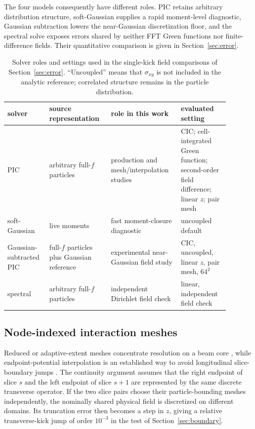 \documentclass[a4paper,fleqn]{cas-sc}
\begin{document}
The four models consequently have different roles.  PIC retains arbitrary
distribution structure, soft-Gaussian supplies a rapid moment-level
diagnostic, Gaussian subtraction lowers the near-Gaussian discretization
floor, and the spectral solve exposes errors shared by neither FFT Green
functions nor finite-difference fields.  Their quantitative comparison is
given in Section~\ref{sec:error}.

\FloatBarrier
\begin{table}[pos=ht]
\centering
\small
\caption{Solver roles and settings used in the single-kick field
comparisons of Section~\ref{sec:error}.
``Uncoupled'' means that $\sigma_{xy}$ is not included in the analytic
reference; correlated structure remains in the particle distribution.}
\label{tab:solver_capabilities}
\begin{tabular}{@{}>{\raggedright\arraybackslash}p{0.16\linewidth}
                    >{\raggedright\arraybackslash}p{0.25\linewidth}
                    >{\raggedright\arraybackslash}p{0.28\linewidth}
                    >{\raggedright\arraybackslash}p{0.20\linewidth}@{}}
\toprule
solver & source representation & role in this work & evaluated setting \\
\midrule
PIC & arbitrary full-$f$ particles &
production and mesh/interpolation studies &
CIC; cell-integrated Green function; second-order field difference; linear
$z$; pair mesh \\
soft-Gaussian & live moments &
fast moment-closure diagnostic &
uncoupled default \\
Gaussian-subtracted PIC & full-$f$ particles plus Gaussian reference &
experimental near-Gaussian field study &
CIC, uncoupled, linear $z$, pair mesh, $64^2$ \\
spectral & arbitrary full-$f$ particles &
independent Dirichlet field check &
linear, independent field check \\
\bottomrule
\end{tabular}
\end{table}

\subsection{Node-indexed interaction meshes}
\label{sec:nodemesh}

Reduced or adaptive-extent meshes concentrate resolution on a beam core
\citep{CaiReducedMesh2001}, while endpoint-potential interpolation is an
established way to avoid longitudinal slice-boundary jumps
\citep{OhmiTawadaOide2003,KabelCai2004}.  The continuity argument assumes
that the right endpoint of slice $s$ and the left endpoint of slice $s+1$
are represented by the same discrete transverse operator.  If the two slice
pairs choose their particle-bounding meshes independently, the nominally
shared physical field is discretized on different domains.  Its truncation
error then becomes a step in $z$, giving a relative transverse-kick jump of
order $10^{-3}$ in the test of Section~\ref{sec:boundary}.
\end{document}
